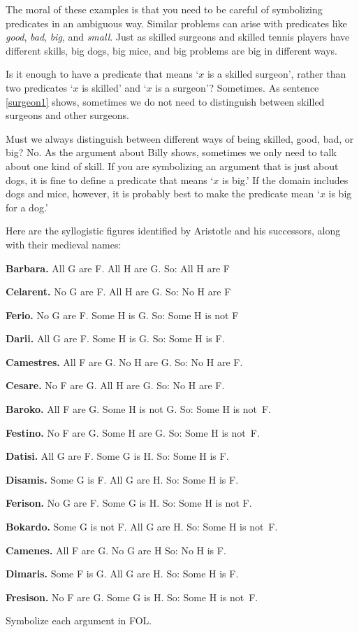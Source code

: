The moral of these examples is that you need to be careful of symbolizing predicates in an ambiguous way. Similar problems can arise with predicates like \emph{good}, \emph{bad}, \emph{big}, and \emph{small}. Just as skilled surgeons and skilled tennis players have different skills, big dogs, big mice, and big problems are big in different ways.

Is it enough to have a predicate that means `$x$ is a skilled surgeon', rather than two predicates `$x$ is skilled' and `$x$ is a surgeon'? Sometimes. As sentence \ref{surgeon1} shows, sometimes we do not need to distinguish between skilled surgeons and other surgeons.

Must we always distinguish between different ways of being skilled, good, bad, or big? No. As the argument about Billy shows, sometimes we only need to talk about one kind of skill. If you are symbolizing an argument that is just about dogs, it is fine to define a predicate that means `$x$ is big.' If the domain includes dogs and mice, however, it is probably best to make the predicate mean `$x$ is big for a dog.'

\practiceproblems
\problempart
\label{pr.BarbaraEtc}
Here are the syllogistic figures identified by Aristotle and his successors, along with their medieval names:
\begin{earg}
	\item \textbf{Barbara.} All G are F. All H are G. So:  All H are F
	\item \textbf{Celarent.} No G are F. All H are G. So: No H are F
	\item \textbf{Ferio.} No G are F. Some H is G. So: Some H is not F
	\item \textbf{Darii.} All G are F. Some H is G. So: Some H is F.
	\item \textbf{Camestres.} All F are G. No H are G. So: No H are F.
	\item \textbf{Cesare.} No F are G. All H are G. So: No H are F.
	\item \textbf{Baroko.} All F are G. Some H is not G. So: Some H is not~F.
	\item \textbf{Festino.} No F are G. Some H are G. So: Some H is not~F.
	\item \textbf{Datisi.} All G are F. Some G is H. So: Some H is F.
	\item \textbf{Disamis.} Some G is F. All G are H. So: Some H is F.
	\item \textbf{Ferison.} No G are F. Some G is H. So: Some H is not F.
	\item \textbf{Bokardo.} Some G is not F. All G are H. So:  Some H is not~F.
	\item \textbf{Camenes.} All F are G. No G are H So: No H is F.
	\item \textbf{Dimaris.} Some F is G. All G are H. So: Some H is F.
	\item \textbf{Fresison.} No F are G. Some G is H. So: Some H is not~F.
\end{earg}
Symbolize each argument in FOL.


